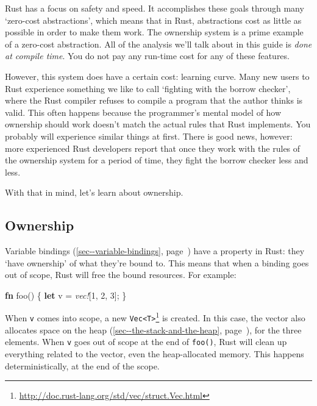 \documentclass[a4paper,]{book}
\renewcommand*{\hyperref}[2][\ar]{%
  \def\ar{#2}%
  #2 (\autoref{#1}, page~\pageref{#1})}
\newenvironment{Shaded}{\begin{snugshade}}{\end{snugshade}}
\newcommand{\KeywordTok}[1]{\textcolor[rgb]{0.13,0.29,0.53}{\textbf{{#1}}}}
\newcommand{\DecValTok}[1]{\textcolor[rgb]{0.00,0.00,0.81}{{#1}}}
\newcommand{\PreprocessorTok}[1]{\textcolor[rgb]{0.56,0.35,0.01}{\textit{{#1}}}}
\newcommand{\NormalTok}[1]{{#1}}
\renewcommand{\href}[2]{#2\footnote{\url{#1}}}
\begin{document}
Rust has a focus on safety and speed. It accomplishes these goals
through many `zero-cost abstractions', which means that in Rust,
abstractions cost as little as possible in order to make them work. The
ownership system is a prime example of a zero-cost abstraction. All of
the analysis we'll talk about in this guide is \emph{done at compile
time}. You do not pay any run-time cost for any of these features.

However, this system does have a certain cost: learning curve. Many new
users to Rust experience something we like to call `fighting with the
borrow checker', where the Rust compiler refuses to compile a program
that the author thinks is valid. This often happens because the
programmer's mental model of how ownership should work doesn't match the
actual rules that Rust implements. You probably will experience similar
things at first. There is good news, however: more experienced Rust
developers report that once they work with the rules of the ownership
system for a period of time, they fight the borrow checker less and
less.

With that in mind, let's learn about ownership.

\subsection{Ownership}\label{ownership}

\hyperref[sec--variable-bindings]{Variable bindings} have a property in
Rust: they `have ownership' of what they're bound to. This means that
when a binding goes out of scope, Rust will free the bound resources.
For example:

\begin{Shaded}
\begin{Highlighting}[]
\KeywordTok{fn} \NormalTok{foo() \{}
    \KeywordTok{let} \NormalTok{v = }\PreprocessorTok{vec!}\NormalTok{[}\DecValTok{1}\NormalTok{, }\DecValTok{2}\NormalTok{, }\DecValTok{3}\NormalTok{];}
\NormalTok{\}}
\end{Highlighting}
\end{Shaded}

When \texttt{v} comes into scope, a new
\href{http://doc.rust-lang.org/std/vec/struct.Vec.html}{\texttt{Vec\textless{}T\textgreater{}}}
is created. In this case, the vector also allocates space on
\hyperref[sec--the-stack-and-the-heap]{the heap}, for the three
elements. When \texttt{v} goes out of scope at the end of
\texttt{foo()}, Rust will clean up everything related to the vector,
even the heap-allocated memory. This happens deterministically, at the
end of the scope.
\end{document}
